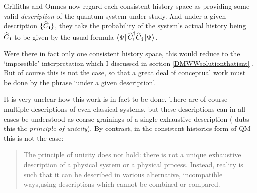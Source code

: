 \documentclass[12pt]{article}
\newcommand{\vctr}[1]{\ensuremath{\mathbf{ #1 }}}
\newcommand{\ket}[1]{\ensuremath{\left|  #1 \right\rangle}}
\newcommand{\bra}[1]{\ensuremath{\left\langle #1 \right|}}
\newcommand{\matel}[3]{\ensuremath{\bra{#1} #2 \ket{#3}}}
\newcommand{\op}[1]{\ensuremath{\widehat{\textsf{\ensuremath{#1}}}}}
\newcommand{\opad}[1]{\ensuremath{\op{#1}^{\dagger}}}
\begin{document}
Griffiths and Omnes now regard each consistent history space as providing some valid \emph{description} of the quantum system under study. And under a given description $\{\op{C}_\vctr{i}\}$, they take the probability of the system's actual history being $\op{C}_\vctr{i}$ to be given by the usual formula $\matel{\Psi}{\opad{C}_\vctr{i}\op{C}_\vctr{i}}{\Psi}$. 

Were there in fact only one consistent history space, this would reduce to the `impossible' interpretation which I discussed in section \ref{DMWWsolutionthatisnt} . But of course this is not the case, so that a great deal of conceptual work must be done by the phrase `under a given description'.

It is very unclear how this work is in fact to be done. There are of course multiple descriptions of even classical systems, but these descriptions can in all cases be understood as coarse-grainings of a single exhaustive description ( dubs this the \emph{principle of unicity}). By contrast, in the consistent-histories form of QM this is not the case:
\begin{quote}
The principle of unicity does not hold: there is not a unique exhaustive description of a physical system or a physical process. Instead, reality is such that it can be described in various alternative, incompatible ways,using descriptions which cannot be combined or compared. \cite[p.\,365]{griffithsbook}
\end{quote}
\end{document}

